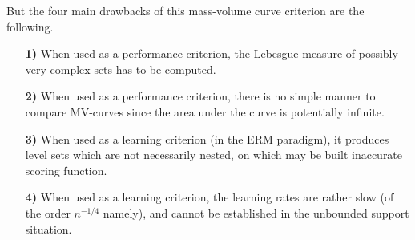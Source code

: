 But the four main drawbacks of this mass-volume curve criterion are the following.
\begin{itemize}
\item[\textbf{1)}] When used as a performance criterion, the Lebesgue measure of possibly very complex sets has to be computed.
\item[\textbf{2)}] When used as a performance criterion, there is no simple manner to compare MV-curves since the area under the curve is potentially infinite. %
\item[\textbf{3)}] When used as a learning criterion (in the ERM paradigm), it produces level sets which are not necessarily nested, on which may be built inaccurate scoring function. 
\item[\textbf{4)}] When used as a learning criterion, the learning rates are rather slow (of the order $n^{-1/4}$ namely), and cannot be established in the unbounded support situation.
\end{itemize}




